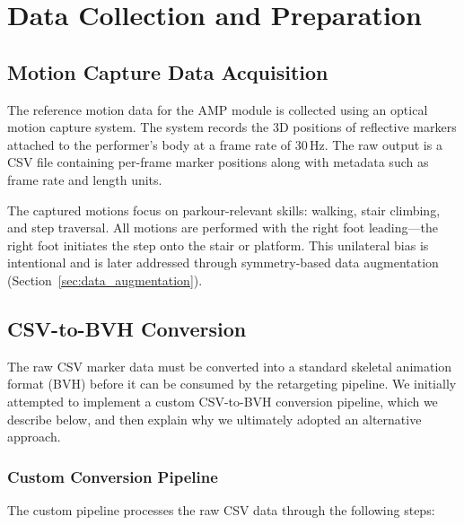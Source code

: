 \section{Data Collection and Preparation}
\label{sec:data_collection}

\subsection{Motion Capture Data Acquisition}
\label{sec:mocap_acquisition}

The reference motion data for the AMP module is collected using an optical motion capture system. The system records the 3D positions of reflective markers attached to the performer's body at a frame rate of 30\,Hz. The raw output is a CSV file containing per-frame marker positions along with metadata such as frame rate and length units.

The captured motions focus on parkour-relevant skills: walking, stair climbing, and step traversal. All motions are performed with the right foot leading---the right foot initiates the step onto the stair or platform. This unilateral bias is intentional and is later addressed through symmetry-based data augmentation (Section~\ref{sec:data_augmentation}).

\subsection{CSV-to-BVH Conversion}
\label{sec:csv_to_bvh}

The raw CSV marker data must be converted into a standard skeletal animation format (BVH) before it can be consumed by the retargeting pipeline. We initially attempted to implement a custom CSV-to-BVH conversion pipeline, which we describe below, and then explain why we ultimately adopted an alternative approach.

\subsubsection{Custom Conversion Pipeline}

The custom pipeline processes the raw CSV data through the following steps:

